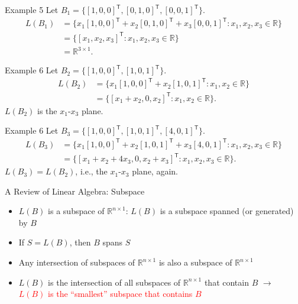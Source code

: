 \documentclass[aspectratio=169,hyperref,UTF8,CJK]{beamer}
\newcommand{\R}{\mathbb{R}}
\newcommand{\trans}{\mathsf{T}}
\begin{document}
\begin{frame}{Example 5}
  \small
  Let $B_1=\{[1,0,0]^{\trans},[0,1,0]^{\trans},[0,0,1]^{\trans}\}$.
  \begin{align*}
    L(B_1)
    &=\{x_1[1,0,0]^{\trans}+x_2[0,1,0]^{\trans}+x_3[0,0,1]^{\trans}:x_1,x_2,x_3\in\R\}\\
    &=\{[x_1,x_2,x_3]^{\trans}:x_1,x_2,x_3\in\R\}\\
    &=\R^{3\times1}.
  \end{align*}
\end{frame}

\begin{frame}{Example 6}
  \small
  Let $B_2=\{[1,0,0]^{\trans},[1,0,1]^{\trans}\}$.
  \begin{align*}
    L(B_2)
    &=\{x_1[1,0,0]^{\trans}+x_2[1,0,1]^{\trans}:x_1,x_2\in\R\}\\
    &=\{[x_1+x_2,0,x_2]^{\trans}:x_1,x_2\in\R\}.
  \end{align*}
  $L(B_2)$ is the $x_1$-$x_3$ plane.
\end{frame}

\begin{frame}{Example 6}
  \small
  Let $B_3=\{[1,0,0]^{\trans},[1,0,1]^{\trans},[4,0,1]^{\trans}\}$.
  \begin{align*}
    L(B_3)
    &=\{x_1[1,0,0]^{\trans}+x_2[1,0,1]^{\trans}+x_3[4,0,1]^{\trans}:x_1,x_2,x_3\in\R\}\\
    &=\{[x_1+x_2+4x_3,0,x_2+x_3]^{\trans}:x_1,x_2,x_3\in\R\}.
  \end{align*}
  $L(B_3)=L(B_2)$, i.e., the $x_1$-$x_3$ plane, again.
\end{frame}

\begin{frame}{A Review of Linear Algebra: Subspace}
  \begin{itemize}
    \item $L(B)$ is a subspace of $\R^{n\times1}$: $L(B)$ is a subspace spanned (or generated) by $B$
    \item If $S=L(B)$, then $B$ spans $S$
    \item[$\diamond$] Any intersection of subspaces of $\R^{n\times1}$ is also a subspace of $\R^{n\times1}$
    \item[$\diamond$] $L(B)$ is the intersection of all subspaces of $\R^{n\times1}$ that contain $B$
      $\longrightarrow$ \textcolor{red}{$L(B)$ is the ``smallest'' subspace that contains $B$}
  \end{itemize}
\end{frame}
\end{document}
